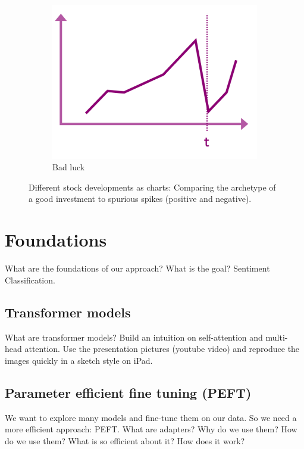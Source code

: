 \documentclass[conference]{IEEEtran}
\begin{document}
\begin{figure}[h!]
\begin{subfigure}{.33\linewidth}
        \centering
        \includegraphics[width=\linewidth]{../5. report/pictures/preproccessing3.png}
        \caption{Bad luck}
        \label{fig:preprocessing3}
    \end{subfigure}
    \caption{Different stock developments as charts: Comparing the archetype of a good investment to spurious spikes (positive and negative). }
    \label{fig:preprocessing}
\end{figure}

\section{Foundations} %
What are the foundations of our approach? What is the goal? Sentiment Classification.
\subsection{Transformer models}%
What are transformer models? 
Build an intuition on self-attention and multi-head attention. 
Use the presentation pictures (youtube video) and reproduce the images quickly in a sketch style on iPad.
\subsection{Parameter efficient fine tuning (PEFT)}%
We want to explore many models and fine-tune them on our data. So we need a more efficient approach: PEFT.
What are adapters? Why do we use them? How do we use them?
What is so efficient about it? How does it work?
\end{document}
